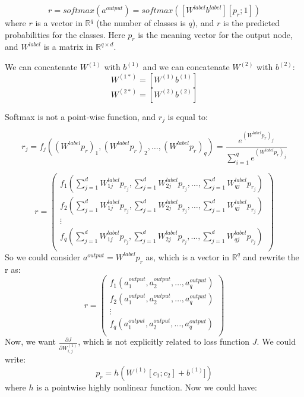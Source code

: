 \documentclass[twoside,12pt]{article}
\begin{document}
\begin{equation}
r = softmax(a^{output})=softmax([W^{label} b^{label}][p_r;1])
\end{equation}
where $r$ is a vector in $\mathbb{R}^q$ (the number of classes is $q$), and $r$ is the predicted probabilities for the classes. Here $p_r$ is the meaning vector for the output node, and $W^{label}$ is a matrix in $\mathbb{R}^{q\times d}$.

We can concatenate $W^{(1)}$ with $b^{(1)}$ and we can concatenate $W^{(2)}$ with $b^{(2)}$:
\begin{equation}
W^{(1*)}=[W^{(1)} b^{(1)}]
\end{equation}
\begin{equation}
W^{(2*)}=[W^{(2)} b^{(2)}]
\end{equation}

Softmax is not a point-wise function, and $r_j$ is equal to:

\begin{equation}
r_j=f_j((W^{label}p_r)_1,(W^{label}p_r)_2,\ldots,(W^{label}p_r)_q)=\frac{e^{(W^{label}p_r)_j}}{\sum_{i=1}^{q}e^{(W^{label}p_r)_j}}
\end{equation}

\begin{equation}
r =
\begin{pmatrix}
  f_1(\sum_{j=1}^{d}W^{label}_{1j} p_{r_j}, \sum_{j=1}^{d}W^{label}_{2j}p_{r_j},\ldots, \sum_{j=1}^{d}W^{label}_{qj}p_{r_j})\\
   f_2(\sum_{j=1}^{d}W^{label}_{1j}p_{r_j}, \sum_{j=1}^{d}W^{label}_{2j}p_{r_j},\ldots, \sum_{j=1}^{d}W^{label}_{qj}p_{r_j}) \\
  \vdots  \\
    f_q(\sum_{j=1}^{d}W^{label}_{1j}p_{r_j}, \sum_{j=1}^{d}W^{label}_{2j}p_{r_j},\ldots, \sum_{j=1}^{d}W^{label}_{qj}p_{r_j})\\
 \end{pmatrix}
\end{equation}
 So we could consider $a^{output}=W^{label}p_r$ as, which is a vector in $\mathbb{R}^q$ and rewrite the r as:
 \begin{equation}
 r=
 \begin{pmatrix}
 f_1(a^{output}_1,a^{output}_2,\ldots,a^{output}_q)\\
  f_2(a^{output}_1,a^{output}_2,\ldots,a^{output}_q)\\
\vdots \\
 f_q(a^{output}_1,a^{output}_2,\ldots,a^{output}_q)\\
 \end{pmatrix}
\end{equation}
Now, we want $\frac{\partial J}{\partial W^{(1)}_{i,j}}$, which is not explicitly related to loss function $J$. We could write:
\begin{equation}
p_r=h(W^{(1)}[c_1;c_2]+b^{(1)}])
\end{equation} 
where $h$ is a pointwise highly nonlinear function. Now we could have:
\end{document}
